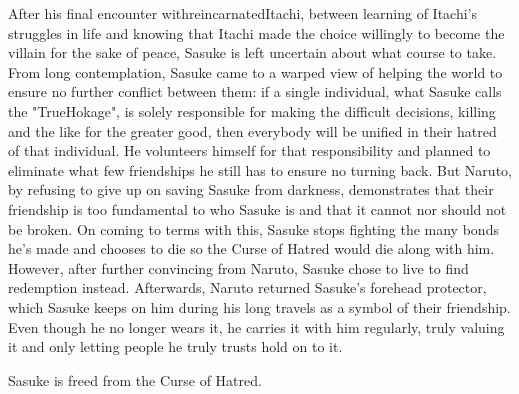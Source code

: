 \documentclass[a4paper,12pt]{article}
\begin{document}
After his final encounter withreincarnatedItachi, between learning of Itachi's struggles in life and knowing that Itachi made the choice willingly to become the villain for the sake of peace, Sasuke is left uncertain about what course to take. From long contemplation, Sasuke came to a warped view of helping the world to ensure no further conflict between them: if a single individual, what Sasuke calls the "TrueHokage", is solely responsible for making the difficult decisions, killing and the like for the greater good, then everybody will be unified in their hatred of that individual. He volunteers himself for that responsibility and planned to eliminate what few friendships he still has to ensure no turning back. But Naruto, by refusing to give up on saving Sasuke from darkness, demonstrates that their friendship is too fundamental to who Sasuke is and that it cannot nor should not be broken. On coming to terms with this, Sasuke stops fighting the many bonds he's made and chooses to die so the Curse of Hatred would die along with him. However, after further convincing from Naruto, Sasuke chose to live to find redemption instead. Afterwards, Naruto returned Sasuke's forehead protector, which Sasuke keeps on him during his long travels as a symbol of their friendship. Even though he no longer wears it, he carries it with him regularly, truly valuing it and only letting people he truly trusts hold on to it.\\ \par \vspace{0.5cm}

Sasuke is freed from the Curse of Hatred.\\ \par \vspace{0.5cm}
\end{document}
